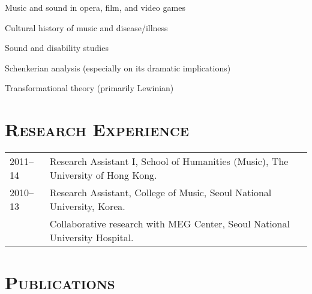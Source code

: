 \documentclass[letter,11pt]{article}
\begin{document}
  \hspace{2mm} \textbullet \hspace{2mm} Music and sound in opera, film, and video games
  
  \noindent \hspace{2mm} \textbullet \hspace{2mm} Cultural history of music and disease/illness
  
  \noindent \hspace{2mm} \textbullet \hspace{2mm} Sound and disability studies
  
  \noindent \hspace{2mm} \textbullet \hspace{2mm} Schenkerian analysis (especially on its dramatic implications)
  
  \noindent \hspace{2mm} \textbullet \hspace{2mm} Transformational theory (primarily Lewinian)
  
  \section*{\textsc{Research Experience}}
  
  \hspace*{-0.25cm}
  \begin{tabular}{p{2.5cm} l}
    2011--14 & Research Assistant I, School of Humanities (Music), The University of Hong Kong.\\[2mm]
    
    2010--13 & Research Assistant, College of Music, Seoul National University, Korea.\\
    & Collaborative research with MEG Center, Seoul National University Hospital.
  \end{tabular}
  
  \vspace*{2.5mm}
  
  \section*{\textsc{Publications}}
  
\end{document}
